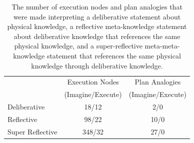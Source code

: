\begin{table}
\centering
\begin{tabular}{|l|c|c|}
\hline
                 &Execution Nodes   &Plan Analogies    \\
                 &{\scriptsize{(Imagine/Execute)}} &{\scriptsize{(Imagine/Execute)}} \\
\hline
Deliberative     & 18/12            & 2/0              \\
\hline
Reflective       & 98/22            & 10/0             \\
\hline
Super Reflective & 348/32           & 27/0             \\
\hline
\end{tabular}
\caption{The number of execution nodes and plan analogies that were
  made interpreting a deliberative statement about physical knowledge,
  a reflective meta-knowledge statement about deliberative knowledge
  that references the same physical knowledge, and a super-reflective
  meta-meta-knowledge statement that references the same physical
  knowledge through deliberative knowledge.}
\label{table:meta_meta_knowledge_complexity}
\end{table}



